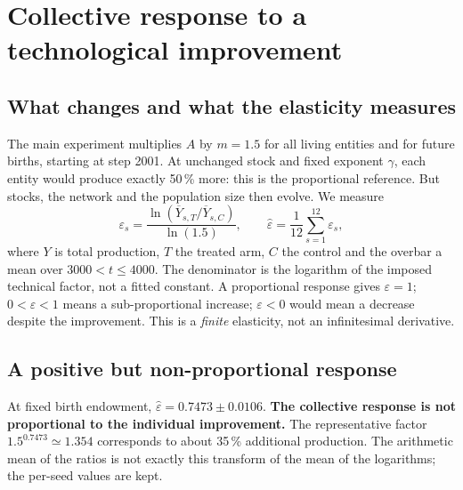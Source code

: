 \section{Collective response to a technological improvement}\label{sec:rebond}
\subsection{What changes and what the elasticity measures}
The main experiment multiplies $A$ by $m=1.5$ for all living entities
and for future births, starting at step 2001. At unchanged stock and
fixed exponent $\gamma$, each entity would produce exactly 50\,\% more:
this is the proportional reference. But stocks, the network and the
population size then evolve. We measure
\begin{equation}
 \varepsilon_s=\frac{\ln(\overline Y_{s,T}/\overline Y_{s,C})}{\ln(1.5)},
 \qquad \widehat\varepsilon=\frac1{12}\sum_{s=1}^{12}\varepsilon_s,
 \label{eq:eps}
\end{equation}
where $Y$ is total production, $T$ the treated arm, $C$ the control and
the overbar a mean over $3000<t\le4000$. The denominator is the
logarithm of the imposed technical factor, not a fitted constant. A
proportional response gives $\varepsilon=1$; $0<\varepsilon<1$ means a
sub-proportional increase; $\varepsilon<0$ would mean a decrease despite
the improvement. This is a \emph{finite} elasticity, not an
infinitesimal derivative.

\subsection{A positive but non-proportional response}
At fixed birth endowment, $\widehat\varepsilon=0.7473\pm0.0106$.
\textbf{The collective response is not proportional to the individual
improvement.} The representative factor $1.5^{0.7473}\simeq1.354$
corresponds to about 35\,\% additional production. The arithmetic mean
of the ratios is not exactly this transform of the mean of the
logarithms; the per-seed values are kept.


